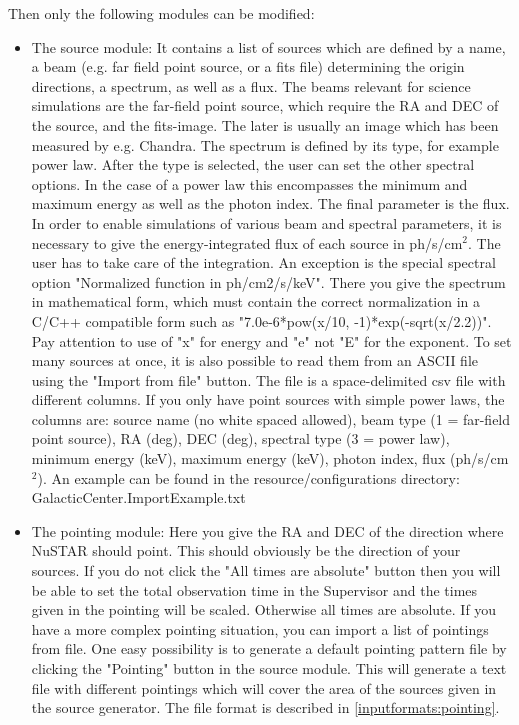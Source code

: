 Then only the following modules can be modified:
\begin{itemize}
\item The source module: 
It contains a list of sources which are defined by a name, a beam (e.g. far field point source, or a fits file) determining the origin directions, a spectrum, as well as a flux.
The beams relevant for science simulations are the far-field point source, which require the RA and DEC of the source, and the fits-image. The later is usually an image which has been measured by e.g. Chandra.
The spectrum is defined by its type, for example power law. 
After the type is selected, the user can set the other spectral options.
In the case of a power law this encompasses the minimum and maximum energy as well as the photon index.
The final parameter is the flux.
In order to enable simulations of various beam and spectral parameters, it is necessary to give the energy-integrated flux of each source in ph/s/cm$^2$. 
The user has to take care of the integration.
An exception is the special spectral option "Normalized function in ph/cm2/s/keV". 
There you give the spectrum in mathematical form, which must contain the correct normalization in a C/C++ compatible form such as "7.0e-6*pow(x/10, -1)*exp(-sqrt(x/2.2))".
Pay attention to use of "x" for energy and "e" not "E" for the exponent.
To set many sources at once, it is also possible to read them from an ASCII file using the "Import from file" button. 
The file is a space-delimited csv file with different columns. If you only have point sources with simple power laws, the columns are: source name (no white spaced allowed), beam type (1 = far-field point source), RA (deg), DEC (deg), spectral type (3 = power law), minimum energy (keV), maximum energy (keV), photon index, flux (ph/s/cm$^2$).
An example can be found in the resource/configurations directory: GalacticCenter.ImportExample.txt
\item The pointing module: 
Here you give the RA and DEC of the direction where NuSTAR should point. 
This should obviously be the direction of your sources.
If you do not click the "All times are absolute" button then you will be able to set the total observation time in the Supervisor and the times given in the pointing will be scaled.
Otherwise all times are absolute. 
If you have a more complex pointing situation, you can import a list of pointings from file.
One easy possibility is to generate a default pointing pattern file by clicking the "Pointing" button in the source module. 
This will generate a text file with different pointings which will cover the area of the sources given in the source generator. The file format is described in \ref{inputformats:pointing}.

\end{itemize}
